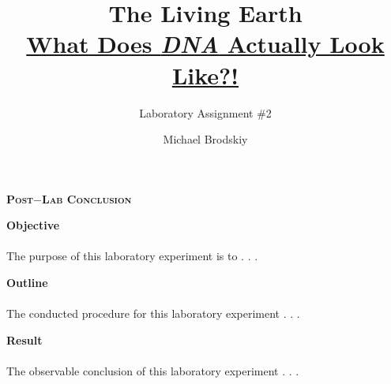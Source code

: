 \documentclass[12pt]{article}
\title{The Living Earth\\\underline{What Does \textbf{\textit{DNA}} Actually Look Like?!}}
\subtitle{Laboratory Assignment \#2}
\author{Michael Brodskiy}
\begin{document}
\maketitle
\begin{center} \textbf{\textsc{Post$-$Lab Conclusion}} \end{center} 
\newpage
{\setlength{\parindent}{0cm} \textbf{Objective}}
\paragraph{} The purpose of this laboratory experiment is to . . . 
\begin{center}\end{center} 
{\setlength{\parindent}{0cm} \textbf{Outline}}
\paragraph{} The conducted procedure for this laboratory experiment . . . 
\begin{center}\end{center} 
{\setlength{\parindent}{0cm} \textbf{Result}}
\paragraph{} The observable conclusion of this laboratory experiment . . . \\
\end{document}
